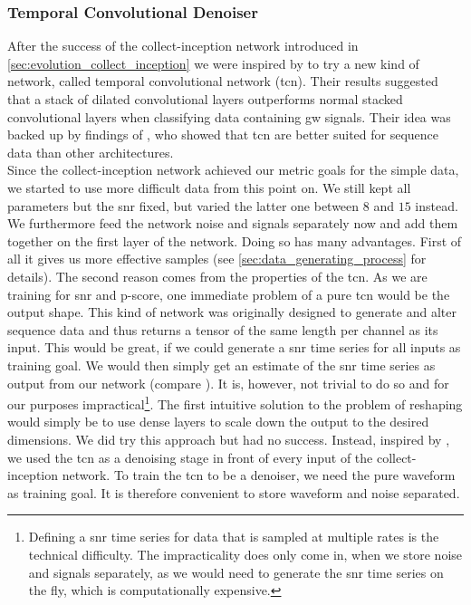 \subsubsection{Temporal Convolutional Denoiser}\label{sec:tcn_denoiser}
After the success of the collect-inception network introduced in \autoref{sec:evolution_collect_inception} we were inspired by \cite{tcn_idea} to try a new kind of network, called temporal convolutional network (\gls{tcn}). Their results suggested that a stack of dilated convolutional layers outperforms normal stacked convolutional layers when classifying data containing \gls{gw} signals. Their idea was backed up by findings of \cite{tcn_paper}, who showed that \gls{tcn} are better suited for sequence data than other architectures.\\
Since the collect-inception network achieved our metric goals for the simple data, we started to use more difficult data from this point on. We still kept all parameters but the \gls{snr} fixed, but varied the latter one between $8$ and $15$ instead. We furthermore feed the network noise and signals separately now and add them together on the first layer of the network. Doing so has many advantages. First of all it gives us more effective samples (see \autoref{sec:data_generating_process} for details). The second reason comes from the properties of the \gls{tcn}. As we are training for \gls{snr} and p-score, one immediate problem of a pure \gls{tcn} would be the output shape. This kind of network was originally designed to generate and alter sequence data and thus returns a tensor of the same length per channel as its input. This would be great, if we could generate a \gls{snr} time series for all inputs as training goal. We would then simply get an estimate of the \gls{snr} time series as output from our network (compare \cite{cnn_magiacal_bullet}). It is, however, not trivial to do so and for our purposes impractical\footnote{Defining a \gls{snr} time series for data that is sampled at multiple rates is the technical difficulty. The impracticality does only come in, when we store noise and signals separately, as we would need to generate the \gls{snr} time series on the fly, which is computationally expensive.}. The first intuitive solution to the problem of reshaping would simply be to use dense layers to scale down the output to the desired dimensions. We did try this approach but had no success. Instead, inspired by \cite{dnn_denoising}, we used the \gls{tcn} as a denoising stage in front of every input of the collect-inception network. To train the \gls{tcn} to be a denoiser, we need the pure waveform as training goal. It is therefore convenient to store waveform and noise separated.\\
